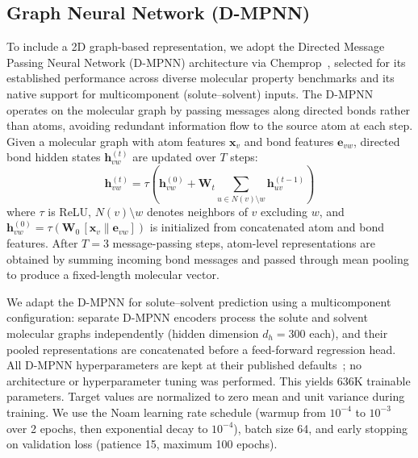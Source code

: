 \documentclass[journal=jcisd8,manuscript=article]{achemso}
\newcommand{\vect}[1]{\mathbf{#1}}
\newcommand{\matr}[1]{\mathbf{#1}}
\newcommand{\removed}[1]{{\color{removedred}#1}}
\begin{document}
\subsection{Graph Neural Network (D-MPNN)}
\label{sec:chemprop}

\removed{To include a 2D graph-based representation, we adopt the Directed Message Passing Neural Network (D-MPNN) architecture via Chemprop~\cite{yangAnalyzingLearnedMolecular2019}, selected for its established performance across diverse molecular property benchmarks and its native support for multicomponent (solute--solvent) inputs.
The D-MPNN operates on the molecular graph by passing messages along directed bonds rather than atoms, avoiding redundant information flow to the source atom at each step.
Given a molecular graph with atom features $\vect{x}_v$ and bond features $\vect{e}_{vw}$, directed bond hidden states $\vect{h}_{vw}^{(t)}$ are updated over $T$ steps:
\begin{equation}
 \vect{h}_{vw}^{(t)} = \tau\!\left(\vect{h}_{vw}^{(0)} + \matr{W}_t \sum_{u \in N(v) \setminus w} \vect{h}_{uv}^{(t-1)}\right)
\end{equation}
where $\tau$ is ReLU, $N(v) \setminus w$ denotes neighbors of $v$ excluding $w$, and $\vect{h}_{vw}^{(0)} = \tau(\matr{W}_0 \, [\vect{x}_v \| \vect{e}_{vw}])$ is initialized from concatenated atom and bond features.
After $T = 3$ message-passing steps, atom-level representations are obtained by summing incoming bond messages and passed through mean pooling to produce a fixed-length molecular vector.

We adapt the D-MPNN for solute--solvent prediction using a multicomponent configuration: separate D-MPNN encoders process the solute and solvent molecular graphs independently (hidden dimension $d_h = 300$ each), and their pooled representations are concatenated before a feed-forward regression head.
All D-MPNN hyperparameters are kept at their published defaults~\cite{yangAnalyzingLearnedMolecular2019}; no architecture or hyperparameter tuning was performed.
This yields 636K trainable parameters.
Target values are normalized to zero mean and unit variance during training.
We use the Noam learning rate schedule (warmup from $10^{-4}$ to $10^{-3}$ over 2 epochs, then exponential decay to $10^{-4}$), batch size 64, and early stopping on validation loss (patience 15, maximum 100 epochs).}
\end{document}
